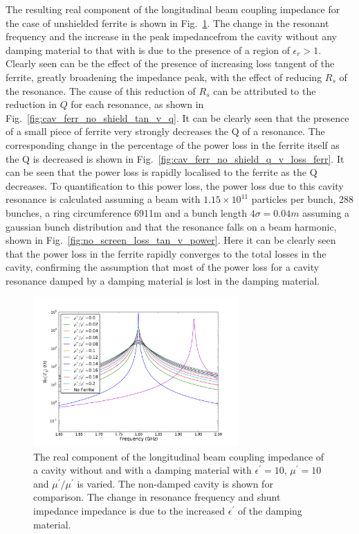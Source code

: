 The resulting real component of the longitudinal beam coupling impedance for the case of unshielded ferrite is shown in Fig.~\ref{fig:no_screen_long_imp}. The change in the resonant frequency and the increase in the peak impedancefrom the cavity without any damping material to that with is due to the presence of a region of $\epsilon_{r}>1$. Clearly seen can be the effect of the presence of increasing loss tangent of the ferrite, greatly broadening the impedance peak, with the effect of reducing $R_{s}$ of the resonance. The cause of this reduction of $R_{s}$ can be attributed to the reduction in $Q$ for each resonance, as shown in Fig.~\ref{fig:cav_ferr_no_shield_tan_v_q}. It can be clearly seen that the presence of a small piece of ferrite very strongly decreases the Q of a resonance. The corresponding change in the percentage of the power loss in the ferrite itself as the Q is decreased is shown in Fig.~\ref{fig:cav_ferr_no_shield_q_v_loss_ferr}. It can be seen that the power loss is rapidly localised to the ferrite as the Q decreases. To quantification to this power loss, the power loss due to this cavity resonance is calculated assuming a beam with $1.15 \times 10^{11}$ particles per bunch, 288 bunches, a ring circumference 6911m and a bunch length $4\sigma = 0.04m$ assuming a gaussian bunch distribution and that the resonance falls on a beam harmonic, shown in Fig.~\ref{fig:no_screen_loss_tan_v_power}. Here it can be clearly seen that the power loss in the ferrite rapidly converges to the total losses in the cavity, confirming the assumption that most of the power loss for a cavity resonance damped by a damping material is lost in the damping material. 

\begin{figure}
\begin{center}
\includegraphics[width=0.7\textwidth]{Beam_Coupling_Impedance_Reduction_Techniques/figures/no_screen_long_imp_all.pdf}
\end{center}
\label{fig:no_screen_long_imp}
\caption{The real component of the longitudinal beam coupling impedance of a cavity without and with a damping material with $\epsilon^{'}=10$, $\mu^{'}=10$ and $\mu^{'}/\mu^{'}$ is varied. The non-damped cavity is shown for comparison. The change in resonance frequency and shunt impedance impedance is due to the increased $\epsilon^{'}$ of the damping material.}
\end{figure}

